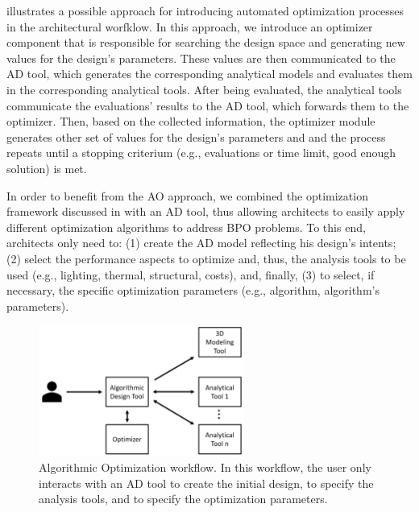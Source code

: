  illustrates a possible approach for introducing automated optimization processes in the architectural worfklow. In this approach, we introduce an optimizer component that is responsible for searching the design space and generating new values for the design's parameters. These values are then communicated to the \ac{AD} tool, which generates the corresponding analytical models and evaluates them in the corresponding analytical tools. After being evaluated, the analytical tools communicate the evaluations' results to the \ac{AD} tool, which forwards them to the optimizer. Then, based on the collected information, the optimizer module generates other set of values for the design's parameters and and the process repeats until a stopping criterium (e.g., evaluations or time limit, good enough solution) is met. 

In order to benefit from the \ac{AO} approach, we combined the optimization framework discussed in  with an \ac{AD} tool, thus allowing architects to easily apply different optimization algorithms to address \ac{BPO} problems. To this end, architects only need to: (1) create the \ac{AD} model reflecting his design's intents; (2) select the performance aspects to optimize and, thus, the analysis tools to be used (e.g., lighting, thermal, structural, costs), and, finally, (3) to select, if necessary, the specific optimization parameters (e.g., algorithm, algorithm's parameters). 

\begin{figure}[htbp]
	\centering
	\includegraphics[width=0.6\textwidth]{./Images/Solution/algorithmic_optimization.png}
	\caption{Algorithmic Optimization workflow. In this workflow, the user only interacts with an \ac{AD} tool to create the initial design, to specify the analysis tools, and to specify the optimization parameters.}
	\label{fig:algorithmicoptimization}
\end{figure}




